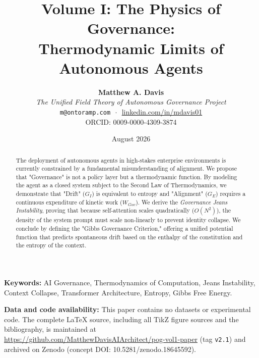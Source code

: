 \documentclass[11pt, a4paper]{article}
\title{\textbf{Volume I: The Physics of Governance:}\\Thermodynamic Limits of Autonomous Agents}
\author{
    \textbf{Matthew A. Davis} \\[0.3em]
    \small \textit{The Unified Field Theory of Autonomous Governance Project} \\[0.3em]
    \footnotesize \texttt{m@ontoramp.com} $\,\cdot\,$ \url{linkedin.com/in/mdavis01} \\[0.3em]
    \footnotesize ORCID: 0009-0000-4309-3874
}
\date{August 2026}
\newcommand{\Ge}{G_E}
\newcommand{\Gi}{G_I}
\newcommand{\Wgov}{W_{Gov}}
\begin{document}
\maketitle

\begin{abstract}
The deployment of autonomous agents in high-stakes enterprise environments is currently constrained by a fundamental misunderstanding of alignment. We propose that "Governance" is not a policy layer but a thermodynamic function. By modeling the agent as a closed system subject to the Second Law of Thermodynamics, we demonstrate that "Drift" ($\Gi$) is equivalent to entropy and "Alignment" ($\Ge$) requires a continuous expenditure of kinetic work ($\Wgov$). We derive the \textit{Governance Jeans Instability}, proving that because self-attention scales quadratically ($O(N^2)$), the density of the system prompt must scale non-linearly to prevent identity collapse. We conclude by defining the "Gibbs Governance Criterion," offering a unified potential function that predicts spontaneous drift based on the enthalpy of the constitution and the entropy of the context.
\end{abstract}

\vspace{1em}
\noindent\textbf{Keywords:} AI Governance, Thermodynamics of Computation, Jeans Instability, Context Collapse, Transformer Architecture, Entropy, Gibbs Free Energy.

\vspace{0.5em}
\noindent\textbf{Data and code availability:} This paper contains no datasets or experimental code. The complete \LaTeX{} source, including all TikZ figure sources and the bibliography, is maintained at \url{https://github.com/MatthewDavisAIArchitect/pog-vol1-paper} (tag \texttt{v2.1}) and archived on Zenodo (concept DOI: 10.5281/zenodo.18645592).

\vspace{1em}
\begin{center}
\begin{tcolorbox}[colback=white, colframe=black, title=\textbf{Contents}]
\makeatletter
{}
\makeatother
\end{tcolorbox}
\end{center}
\vspace{2em}

\end{document}
